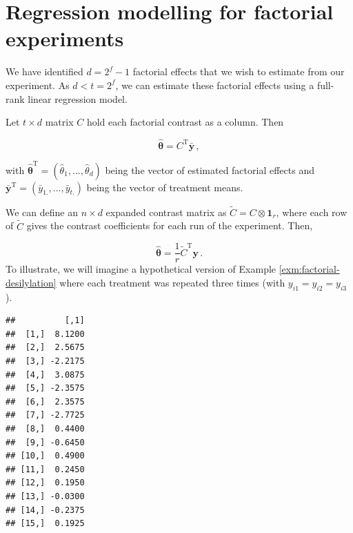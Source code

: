 \documentclass[
]{book}
\newenvironment{Shaded}{\begin{snugshade}}{\end{snugshade}}
\newcommand{\CommentTok}[1]{\textcolor[rgb]{0.56,0.35,0.01}{\textit{#1}}}
\newcommand{\DecValTok}[1]{\textcolor[rgb]{0.00,0.00,0.81}{#1}}
\newcommand{\FunctionTok}[1]{\textcolor[rgb]{0.00,0.00,0.00}{#1}}
\newcommand{\NormalTok}[1]{#1}
\newcommand{\OtherTok}[1]{\textcolor[rgb]{0.56,0.35,0.01}{#1}}
\newcommand{\SpecialCharTok}[1]{\textcolor[rgb]{0.00,0.00,0.00}{#1}}
\theoremstyle{definition}
\theoremstyle{definition}
\theoremstyle{definition}
\theoremstyle{definition}
\theoremstyle{remark}
\begin{document}
\hypertarget{fac-reg}{%
\section{Regression modelling for factorial experiments}\label{fac-reg}}

We have identified \(d = 2^f-1\) factorial effects that we wish to estimate from our experiment. As \(d < t = 2^f\), we can estimate these factorial effects using a full-rank linear regression model.

Let \(t\times d\) matrix \(C\) hold each factorial contrast as a column. Then

\[
\hat{\boldsymbol{\theta}} = C^{\mathrm{T}}\bar{\boldsymbol{y}}\,,
\]

with \(\hat{\boldsymbol{\theta}}^{\mathrm{T}} = (\hat{\theta}_1, \ldots, \hat{\theta}_d)\) being the vector of estimated factorial effects and \(\bar{\boldsymbol{y}}^{\mathrm{T}} = (\bar{y}_{1.}, \ldots, \bar{y}_{t.})\) being the vector of treatment means.

We can define an \(n\times d\) expanded contrast matrix as \(\tilde{C} = C \otimes \boldsymbol{1}_r\), where each row of \(\tilde{C}\) gives the contrast coefficients for each run of the experiment. Then,

\[
\hat{\boldsymbol{\theta}} = \frac{1}{r}\tilde{C}^{\mathrm{T}}\boldsymbol{y}\,.
\]
To illustrate, we will imagine a hypothetical version of Example \ref{exm:factorial-desilylation} where each treatment was repeated three times (with \(y_{i1} = y_{i2} = y_{i3}\)).

\begin{Shaded}
\end{Shaded}

\begin{verbatim}
##          [,1]
##  [1,]  8.1200
##  [2,]  2.5675
##  [3,] -2.2175
##  [4,]  3.0875
##  [5,] -2.3575
##  [6,]  2.3575
##  [7,] -2.7725
##  [8,]  0.4400
##  [9,] -0.6450
## [10,]  0.4900
## [11,]  0.2450
## [12,]  0.1950
## [13,] -0.0300
## [14,] -0.2375
## [15,]  0.1925
\end{verbatim}
\end{document}
